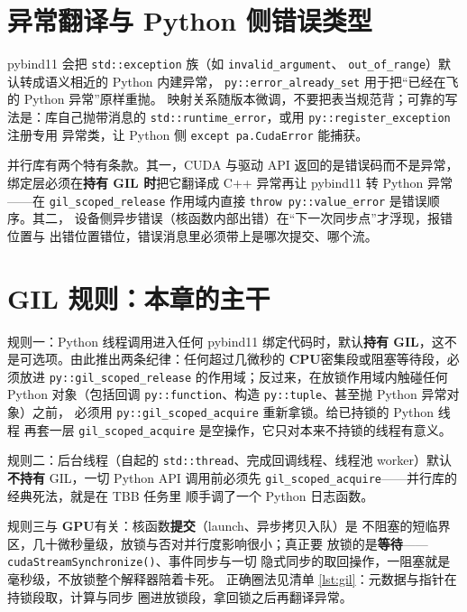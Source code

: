 \documentclass[12pt,a4paper,fontset=fandol]{ctexbook}
\newcommand{\Fn}[1]{\texttt{#1()}}
\newcommand{\Tp}[1]{\texttt{#1}}
\newcommand{\Dom}[1]{\textsf{\bfseries #1}}
\newcommand{\CPU}{\Dom{CPU}}
\newcommand{\GPU}{\Dom{GPU}}
\begin{document}
\section{异常翻译与 Python 侧错误类型}

pybind11 会把 \Tp{std::exception} 族（如 \Tp{invalid\_argument}、
\Tp{out\_of\_range}）默认转成语义相近的 Python 内建异常，
\Tp{py::error\_already\_set} 用于把``已经在飞的 Python 异常''原样重抛。
映射关系随版本微调，不要把表当规范背；可靠的写法是：库自己抛带消息的
\Tp{std::runtime\_error}，或用 \Tp{py::register\_exception} 注册专用
异常类，让 Python 侧 \Tp{except pa.CudaError} 能捕获。

并行库有两个特有条款。其一，CUDA 与驱动 API 返回的是错误码而不是异常，
绑定层必须在\textbf{持有 GIL 时}把它翻译成 C++ 异常再让 pybind11 转
Python 异常——在 \Tp{gil\_scoped\_release} 作用域内直接
\Tp{throw py::value\_error} 是错误顺序。其二，
设备侧异步错误（核函数内部出错）在``下一次同步点''才浮现，报错位置与
出错位置错位，错误消息里必须带上是哪次提交、哪个流。

\section{GIL 规则：本章的主干}

规则一：Python 线程调用进入任何 pybind11 绑定代码时，默认\textbf{持有
GIL}，这不是可选项。由此推出两条纪律：任何超过几微秒的
\CPU{}密集段或阻塞等待段，必须放进 \Tp{py::gil\_scoped\_release}
的作用域；反过来，在放锁作用域内触碰任何 Python 对象（包括回调
\Tp{py::function}、构造 \Tp{py::tuple}、甚至抛 Python 异常对象）之前，
必须用 \Tp{py::gil\_scoped\_acquire} 重新拿锁。给已持锁的 Python 线程
再套一层 \Tp{gil\_scoped\_acquire} 是空操作，它只对本来不持锁的线程有意义。

规则二：后台线程（自起的 \Tp{std::thread}、完成回调线程、线程池
worker）默认\textbf{不持有} GIL，一切 Python API 调用前必须先
\Tp{gil\_scoped\_acquire}——并行库的经典死法，就是在 TBB 任务里
顺手调了一个 Python 日志函数。

规则三与 \GPU{}有关：核函数\textbf{提交}（launch、异步拷贝入队）是
不阻塞的短临界区，几十微秒量级，放锁与否对并行度影响很小；真正要
放锁的是\textbf{等待}——\Fn{cudaStreamSynchronize}、事件同步与一切
隐式同步的取回操作，一阻塞就是毫秒级，不放锁整个解释器陪着卡死。
正确圈法见清单 \ref{lst:gil}：元数据与指针在持锁段取，计算与同步
圈进放锁段，拿回锁之后再翻译异常。
\end{document}
